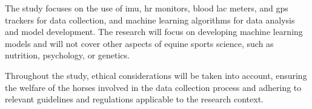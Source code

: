 The study focuses on the use of \gls{imu}, \gls{hr} monitors, blood \gls{lac} meters, and \gls{gps} trackers for data collection, and machine learning algorithms for data analysis and model development. The research will focus on developing machine learning models and will not cover other aspects of equine sports science, such as nutrition, psychology, or genetics.

Throughout the study, ethical considerations will be taken into account, ensuring the welfare of the horses involved in the data collection process and adhering to relevant guidelines and regulations applicable to the research context.